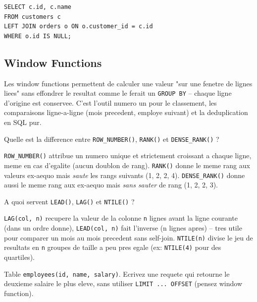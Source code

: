 \documentclass[11pt,a4paper]{article}
\begin{document}
\begin{lstlisting}[style=sqlstyle]
SELECT c.id, c.name
FROM customers c
LEFT JOIN orders o ON o.customer_id = c.id
WHERE o.id IS NULL;
\end{lstlisting}

\subsection{Window Functions}

\begin{cle}
Les window functions permettent de calculer une valeur "sur une fenetre de lignes liees" sans effondrer le resultat comme le ferait un \texttt{GROUP BY} -- chaque ligne d'origine est conservee. C'est l'outil numero un pour le classement, les comparaisons ligne-a-ligne (mois precedent, employe suivant) et la deduplication en SQL pur.
\end{cle}

\begin{question} Quelle est la difference entre \texttt{ROW\_NUMBER()}, \texttt{RANK()} et \texttt{DENSE\_RANK()} ?
\end{question}
\begin{reponse}
\texttt{ROW\_NUMBER()} attribue un numero unique et strictement croissant a chaque ligne, meme en cas d'egalite (aucun doublon de rang). \texttt{RANK()} donne le meme rang aux valeurs ex-aequo mais \emph{saute} les rangs suivants (1, 2, 2, 4). \texttt{DENSE\_RANK()} donne aussi le meme rang aux ex-aequo mais \emph{sans sauter} de rang (1, 2, 2, 3).
\end{reponse}

\begin{question} A quoi servent \texttt{LEAD()}, \texttt{LAG()} et \texttt{NTILE()} ?
\end{question}
\begin{reponse}
\texttt{LAG(col, n)} recupere la valeur de la colonne \texttt{n} lignes avant la ligne courante (dans un ordre donne), \texttt{LEAD(col, n)} fait l'inverse (n lignes apres) -- tres utile pour comparer un mois au mois precedent sans self-join. \texttt{NTILE(n)} divise le jeu de resultats en \texttt{n} groupes de taille a peu pres egale (ex: \texttt{NTILE(4)} pour des quartiles).
\end{reponse}

\begin{coding}
Table \texttt{employees(id, name, salary)}. Ecrivez une requete qui retourne le deuxieme salaire le plus eleve, sans utiliser \texttt{LIMIT ... OFFSET} (pensez window function).
\end{coding}
\end{document}
